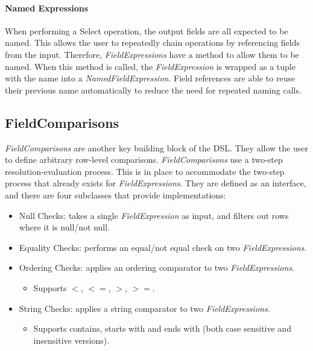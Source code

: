 \paragraph{Named Expressions}
When performing a Select operation, the output fields are all expected to be named. This allows the user to repeatedly chain operations by referencing fields from the input. Therefore, \textit{FieldExpressions} have a method to allow them to be named. When this method is called, the \textit{FieldExpression} is wrapped as a tuple with the name into a \textit{NamedFieldExpression}. Field references are able to reuse their previous name automatically to reduce the need for repeated naming calls. 


\subsection{FieldComparisons}
\textit{FieldComparisons} are another key building block of the DSL. They allow the user to define arbitrary row-level comparisons. \textit{FieldComparisons} use a two-step resolution-evaluation process. This is in place to accommodate the two-step process that already exists for \textit{FieldExpressions}. They are defined as an interface, and there are four subclasses that provide implementations:

\begin{itemize}
	\item Null Checks: takes a single \textit{FieldExpression} as input, and filters out rows where it is null/not null.
	\item Equality Checks: performs an equal/not equal check on two \textit{FieldExpressions}.
	\item Ordering Checks: applies an ordering comparator to two \textit{FieldExpressions}.
	\begin{itemize}
		\item Supports $<$, $<=$, $>$, $>=$.
	\end{itemize}
	\item String Checks: applies a string comparator to two \textit{FieldExpressions}.
	\begin{itemize}
		\item Supports contains, starts with and ends with (both case sensitive and insensitive versions).
	\end{itemize}
\end{itemize}


